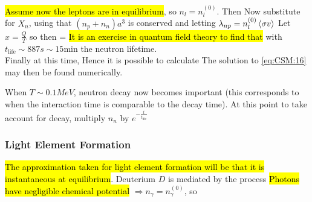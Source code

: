 \documentclass{article}
\begin{document}
\hl{Assume now the leptons are in equilibrium}, so $n_l = n_l^{(0)}$. Then 
Now substitute for $X_n$, using that $(n_p + n_n)a^3$ is conserved and letting $\lambda_{np}=n_l^{(0)} \braket{\sigma v}$
Let $x=\frac{Q}{T}$ so 
then 
\be\label{eq:CSM:16}
 = \left[ e^-x - X_n(1+e^{-x})\right]
\ee
\hl{It is an exercise in quantum field theory to find that }
with $t_{\text{life}} \sim 887s\sim 15\text{min}$ the neutron lifetime. \\
Finally at this time, 
Hence it is possible to calculate 
The solution to \ref{eq:CSM:16} may then be found numerically. 

\begin{remark}
When $T\sim 0.1 MeV$, neutron decay now becomes important (this corresponds to when the interaction time is comparable to the decay time). At this point to take account for decay, multiply $n_n$ by $e^{-\frac{t}{t_{\text{life}}}}$
\end{remark}

\subsubsection*{Light Element Formation}
\hl{The approximation taken for light element formation will be that it is instantaneous at equilibrium}. Deuterium $D$ is mediated by the process 
\hl{Photons have negligible chemical potential} $\Rightarrow n_\gamma = n_\gamma^{(0)}$, so 
\end{document}
